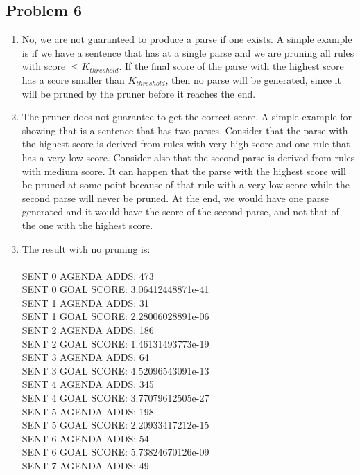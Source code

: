 \documentclass{article}
\begin{document}
\begin{spacing}{1.1}
\section{Problem 6}
\begin{enumerate}
	\item No, we are not guaranteed to produce a parse if one exists. A simple example is if we have a sentence that has at a single parse and we are pruning all rules with score $\le K_{threshold}$. If the final score of the parse with the highest score has a score smaller than $K_{threshold}$, then no parse will be generated, since it will be pruned by the pruner before it reaches the end.
	\item The pruner does not guarantee to get the correct score. A simple example for showing that is a sentence that has two parses. Consider that the parse with the highest score is derived from rules with very high score and one rule that has a very low score. Consider also that the second parse is derived from rules with medium score. It can happen that the parse with the highest score will be pruned at some point because of that rule with a very low score while the second parse will never be pruned. At the end, we would have one parse generated and it would have the score of the second parse, and not that of the one with the highest score.
	\item
	The result with no pruning is:\\
	\\
SENT 0 AGENDA ADDS: 473\\
SENT 0 GOAL SCORE: 3.06412448871e-41\\
SENT 1 AGENDA ADDS: 31\\
SENT 1 GOAL SCORE: 2.28006028891e-06\\
SENT 2 AGENDA ADDS: 186\\
SENT 2 GOAL SCORE: 1.46131493773e-19\\
SENT 3 AGENDA ADDS: 64\\
SENT 3 GOAL SCORE: 4.52096543091e-13\\
SENT 4 AGENDA ADDS: 345\\
SENT 4 GOAL SCORE: 3.77079612505e-27\\
SENT 5 AGENDA ADDS: 198\\
SENT 5 GOAL SCORE: 2.20933417212e-15\\
SENT 6 AGENDA ADDS: 54\\
SENT 6 GOAL SCORE: 5.73824670126e-09\\
SENT 7 AGENDA ADDS: 49\\

\end{enumerate}
\end{spacing}
\end{document}
